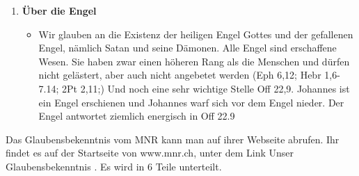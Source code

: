 \documentclass{../../inc/mybib}
\begin{document}
\begin{spacing}{1.5}
\begin{enumerate}
\begin{itemize}
            \item Wir glauben, dass die Gemeinde Jesu Christi aus wiedergeborenen Juden und Heiden besteht (Gal 3,28; Kol 3,11) und Gottes Volk ist. Doch wir glauben auch, dass die Gemeinde nicht das einzige Volk des Herrn ist. Wir glauben, dass Gott die Nation Israel nicht verworfen (Jer 31; Röm 11), sondern lediglich beiseite gestellt hat, bis die Gemeinde vollzählig ist.
            
            \item Wir glauben, dass Gott heute bereits dabei ist, das Volk Israel in seinem Heimatland zu sammeln (Hes 36,24;). Die Entstehung des Staates Israel 1948 zeigt uns, dass sich jahrtausendealte Prophetie erfüllt (Zef 2,1-2). Wir glauben, dass das Volk Israel bei der Wiederkunft Jesu in Herrlichkeit Ihn als den Messias erkennen, errettet werden und die Versprechungen erhalten wird, die Gott im Alten Testament gemacht und noch nicht eingelöst hat (Jes; Jer; Hes; Sach u.a.; vgl. Offb 21,5-6).
            
            \item Wir glauben, dass bis zur Wiederkunft des Herrn geistlich gesehen jedoch nur die Juden «wahre Juden» und das «Israel Gottes» sind, die durch den Glauben an Jesus Christus aus Gnade errettet wurden (Röm 5,11). Diese sind in Christus eins mit den Gläubigen aus den Nationen und gehören zum geistlichen Volk der Gemeinde (Eph 2,11.13).            
        \end{itemize}
        \item \textbf{Über die Engel}
        \begin{itemize}
            \item Wir glauben an die Existenz der heiligen Engel Gottes und der gefallenen Engel, nämlich Satan und seine Dämonen. Alle Engel sind erschaffene Wesen. Sie haben zwar einen höheren Rang als die Menschen und dürfen nicht gelästert, aber auch nicht angebetet werden (Eph 6,12; Hebr 1,6-7.14; 2Pt 2,11;) Und noch eine sehr wichtige Stelle Off 22,9. Johannes ist ein Engel erschienen und Johannes warf sich vor dem Engel nieder. Der Engel antwortet ziemlich energisch in Off 22.9
        \end{itemize}
    \end{enumerate}
    Das Glaubensbekenntnis vom MNR kann man auf ihrer Webseite abrufen. Ihr findet es auf der Startseite von www.mnr.ch, unter dem Link \frqq Unser Glaubensbekenntnis \flqq{}. Es wird in 6 Teile unterteilt.
\end{spacing}
\end{document}
